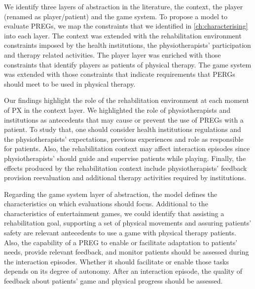 We identify three layers of abstraction in the literature, the context, the player (renamed as player/patient) and the game system. To propose a model to evaluate \acp{PREG}, we map the constraints that we identified in \autoref{ch:characterising} into each layer. The context was extended with the rehabilitation environment constraints imposed by the health institutions, the physiotherapists' participation and therapy related activities. The player layer was enriched with those constraints that identify players as patients of physical therapy. The game system was extended with those constraints that indicate requirements that \acp{PERG} should meet to be used in physical therapy.

Our findings highlight the role of the rehabilitation environment at each moment of \ac{PX} in the context layer. We highlighted the role of physiotherapists and institutions as antecedents that may cause or prevent the use of \acp{PREG} with a patient. To study that, one should consider health institutions regulations and the physiotherapists' expectations, previous experiences and role as responsible for patients. Also, the rehabilitation context may affect interaction episodes since physiotherapists' should guide and supervise patients while playing. Finally, the effects produced by the rehabilitation context include physiotherapists' feedback provision reevaluation and additional therapy activities required by institutions.

Regarding the game system layer of abstraction, the model defines the characteristics on which evaluations should focus. Additional to the characteristics of entertainment games, we could identify that assisting a rehabilitation goal, supporting a set of physical movements and assuring patients' safety are relevant antecedents to use a game with physical therapy patients. Also,  the capability of a \ac{PREG} to enable or facilitate adaptation to patients' needs, provide relevant feedback, and monitor patients should be assessed during the interaction episodes. Whether it should facilitate or enable those tasks depends on its degree of autonomy. After an interaction episode, the quality of feedback about patients' game and physical progress should be assessed.

